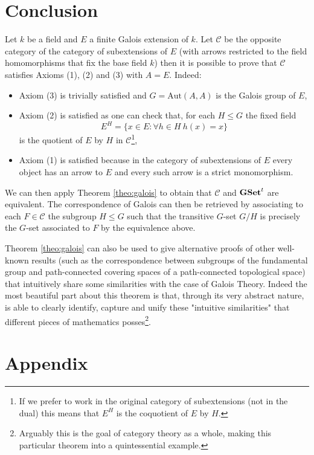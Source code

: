 \documentclass[italian, 12pt, reqno]{article}
\theoremstyle{myteo}
\numberwithin{equation}{section}
\newcommand{\cat}[1]{\mathscr{#1}}
\newcommand{\tgset}{\text{\textbf{GSet}}^t}
\begin{document}
\section{Conclusion}
\label{sec:conclusion}
Let \(k\) be a field and \(E\) a finite Galois extension of \(k\).
Let \(\cat{C}\) be the opposite category of the category of subextensions of \(E\) (with arrows restricted to the field homomorphisms that fix the base field \(k\)) then it is possible to prove that \(\cat{C}\) satisfies Axioms (1), (2) and (3) with \(A=E\).
Indeed:
\begin{itemize}
	\item Axiom (3) is trivially satisfied and \(G = \text{Aut}(A, A)\) is the Galois group of \(E\),
	\item Axiom (2) is satisfied as one can check that, for each \(H\leq G\) the fixed field
		\[E^H = \{x\in E\colon \forall h\in H\ h(x) = x\}\]
		is the quotient of \(E\) by \(H\) in \(\cat{C}\)\footnote{If we prefer to work in the original category of subextensions (not in the dual) this means that \(E^H\) is the coquotient of \(E\) by \(H\).},
	\item Axiom (1) is satisfied because in the category of subextensions of \(E\) every object has an arrow to \(E\) and every such arrow is a strict monomorphism.
\end{itemize}
We can then apply Theorem \ref{theo:galois} to obtain that \(\cat{C}\) and \(\tgset\) are equivalent.
The correspondence of Galois can then be retrieved by associating to each \(F\in\cat{C}\) the subgroup \(H\leq G\) such that the transitive \(G\)-set \(G/H\) is precisely the \(G\)-set associated to \(F\) by the equivalence above.

Theorem \ref{theo:galois} can also be used to give alternative proofs of other well-known results (such as the correspondence between subgroups of the fundamental group and path-connected covering spaces of a path-connected topological space) that intuitively share some similarities with the case of Galois Theory.
Indeed the most beautiful part about this theorem is that, through its very abstract nature, is able to clearly identify, capture and unify these "intuitive similarities" that different pieces of mathematics posses\footnote{Arguably this is the goal of category theory as a whole, making this particular theorem into a quintessential example.}.

\section{Appendix}
\label{sec:appendixes}
\end{document}
